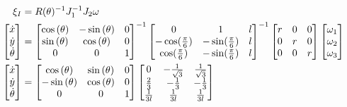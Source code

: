 \documentclass{article}
\begin{document}
\begin{align}
	\vspace{-0.4cm}
    \xi_{I}
        &= R(\theta)^{-1} J_{1}^{-1} J_{2} \omega \\
    \begin{bmatrix}
        \dot{x} \\
        \dot{y} \\
        \dot{\theta}
    \end{bmatrix}      
        &= 
        \begin{bmatrix}
	        \cos{(\theta)} & -\sin{(\theta)} & 0 \\
	        \sin{(\theta)} & \cos{(\theta)} & 0 \\
	        0 & 0 & 1
        \end{bmatrix}^{-1}
        \begin{bmatrix}
            0 & 1 & l \\
          	-\cos(\frac{\pi}{6}) & -\sin(\frac{\pi}{6}) & l \\
        	\cos(\frac{\pi}{6}) & -\sin(\frac{\pi}{6}) & l
        \end{bmatrix}^{-1}
        \begin{bmatrix}
            r & 0 & 0 \\
            0 & r & 0 \\
            0 & 0 & r
        \end{bmatrix}
	    \begin{bmatrix}
	       \omega_{1} \\
	       \omega_{2} \\
	       \omega_{3} \\
	    \end{bmatrix} \\
	 \begin{bmatrix}
	     \dot{x} \\
	     \dot{y} \\
	     \dot{\theta}
	 \end{bmatrix} 
	 	&=
		\begin{bmatrix}
			\cos{(\theta)} & \sin{(\theta)} & 0 \\
			-\sin{(\theta)} & \cos{(\theta)} & 0 \\
			0 & 0 & 1
		\end{bmatrix}
		\begin{bmatrix}
			0 & -\frac{1}{\sqrt{3}} & \frac{1}{\sqrt{3}} \\
			\frac{2}{3} & -\frac{1}{3} & -\frac{1}{3} \\
			\frac{1}{3l} & \frac{1}{3l} & \frac{1}{3l}

\end{bmatrix}
\end{align}
\end{document}
